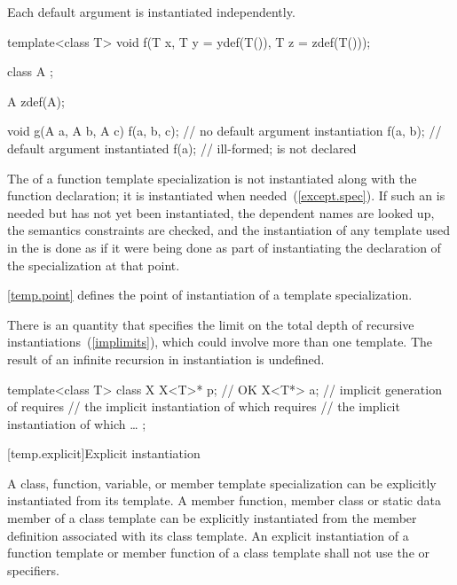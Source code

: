 \pnum
Each default argument is instantiated independently.
\begin{example}

\begin{codeblock}
template<class T> void f(T x, T y = ydef(T()), T z = zdef(T()));

class  A { };

A zdef(A);

void g(A a, A b, A c) {
  f(a, b, c);       // no default argument instantiation
  f(a, b);          // default argument  instantiated
  f(a);             // ill-formed;  is not declared
}
\end{codeblock}
\end{example}

\pnum
The  of a function template specialization
is not instantiated along with the function declaration; it is instantiated
when needed~(\ref{except.spec}). If such an
 is needed but has not yet been
instantiated, the dependent names are looked up, the semantics constraints are
checked, and the instantiation of any template used in the
 is done as if it were being done as part
of instantiating the declaration of the specialization at that point.

\pnum
\begin{note}
\ref{temp.point} defines the point of instantiation of a template specialization.
\end{note}

\pnum
There is an  quantity
that specifies the limit on the total depth of recursive instantiations~(\ref{implimits}),
which could involve more than one template.
The result of an infinite recursion in instantiation is undefined.
\begin{example}

\begin{codeblock}
template<class T> class X {
  X<T>* p;          // OK
  X<T*> a;          // implicit generation of  requires
                    // the implicit instantiation of  which requires
                    // the implicit instantiation of  which \ldots
};
\end{codeblock}
\end{example}

[temp.explicit]{Explicit instantiation}

\pnum
{}%
A class, function, variable, or member template specialization can be explicitly
instantiated from its template.
A member function, member class or static data member of a class template can
be explicitly instantiated from the member definition associated with its class
template. An explicit instantiation of a function template
or member function of a class template
shall not
use the  or  specifiers.

